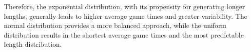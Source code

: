 \documentclass[12pt]{report}
\begin{document}
	Therefore, the exponential distribution, with its propensity for generating longer lengths, generally leads to higher average game times and greater variability. The normal distribution provides a more balanced approach, while the uniform distribution results in the shortest average game times and the most predictable length distribution. 	
	
\end{document}
